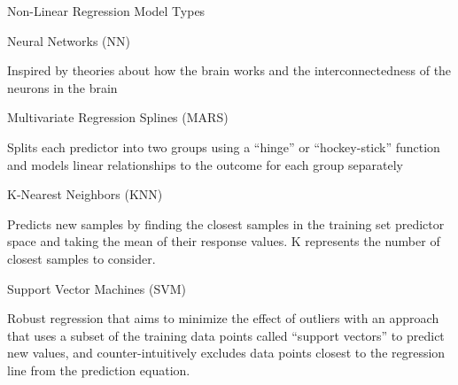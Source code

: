 \documentclass[ignorenonframetext,]{beamer}
\begin{document}
\begin{frame}{Non-Linear Regression Model Types}

\begin{block}{Neural Networks (NN)}

Inspired by theories about how the brain works and the
interconnectedness of the neurons in the brain

\end{block}

\begin{block}{Multivariate Regression Splines (MARS)}

Splits each predictor into two groups using a ``hinge'' or
``hockey-stick'' function and models linear relationships to the outcome
for each group separately

\end{block}

\begin{block}{K-Nearest Neighbors (KNN)}

Predicts new samples by finding the closest samples in the training set
predictor space and taking the mean of their response values. K
represents the number of closest samples to consider.

\end{block}

\begin{block}{Support Vector Machines (SVM)}

Robust regression that aims to minimize the effect of outliers with an
approach that uses a subset of the training data points called ``support
vectors'' to predict new values, and counter-intuitively excludes data
points closest to the regression line from the prediction equation.

\end{block}

\end{frame}
\end{document}
